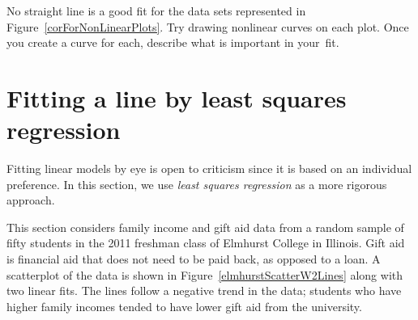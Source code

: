 \begin{exercisewrap}
\begin{nexercise}
No straight line is a good fit for the data sets
represented in Figure~\ref{corForNonLinearPlots}.
Try drawing nonlinear curves on each plot.
Once you create a curve for each, describe what is important
in your~fit.\footnotemark{}
\end{nexercise}
\end{exercisewrap}

%




\section{Fitting a line by least squares regression}
\label{fittingALineByLSR}


Fitting linear models by eye is open to criticism since it is based on an individual preference. In this section, we use \emph{least squares regression} as a more rigorous approach.

This section considers family income and gift aid data from a random sample of fifty students in the 2011 freshman class of Elmhurst College in Illinois. Gift aid is financial aid that does not need to be paid back, as opposed to a loan. A scatterplot of the data is shown in Figure~\ref{elmhurstScatterW2Lines} along with two linear fits. The lines follow a negative trend in the data; students who have higher family incomes tended to have lower gift aid from the university.

